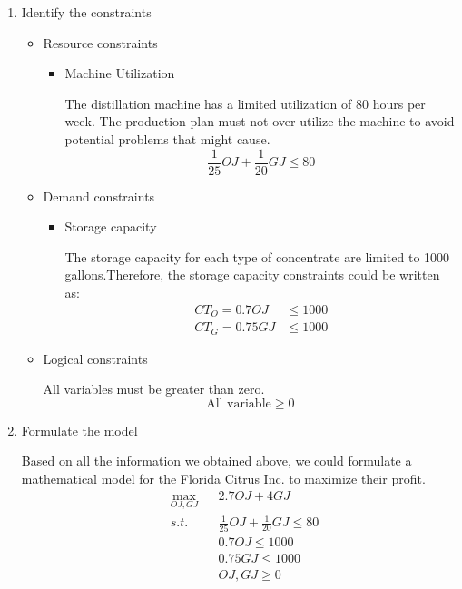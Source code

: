 \documentclass[11pt]{article}
\begin{document}
\begin{enumerate}
\begin{enumerate}
    \item Identify the constraints\par
    \begin{itemize}
        \item Resource constraints\par
        \begin{itemize}
            \item Machine Utilization\par
            The distillation machine has a limited utilization of 80 hours per week. The production plan must not over-utilize the machine to avoid potential problems that might cause. 
            $$
            \frac{1}{25} \mathit{OJ} + \frac{1}{20} \mathit{GJ} \leq 80 
            $$
        \end{itemize}
        \item Demand constraints\par
        \begin{itemize}
            \item Storage capacity\par
            The storage capacity for each type of concentrate are limited to 1000 gallons.Therefore, the storage capacity constraints could be written as:
            \begin{align*}
                  \mathit{CT_O} = 0.7 \mathit{OJ} & \leq 1000  \\
                 \mathit{CT_G} = 0.75 \mathit{GJ} & \leq 1000 
            \end{align*}
        \end{itemize}
        
        \item Logical constraints\par
            All variables must be greater than zero.
            $$
            \text{All variable} \geq 0
            $$    
    \end{itemize}
    \item Formulate the model \par
    Based on all the information we obtained above, we could formulate a mathematical model for the Florida Citrus Inc. to maximize their profit. 
    \begin{align*}
        & \max_{\mathit{OJ}, \mathit{GJ}} & & 2.7\mathit{OJ} + 4\mathit{GJ} \\
        & s.t. & & \frac{1}{25} \mathit{OJ} + \frac{1}{20} \mathit{GJ} \leq 80 \\
        &&&  0.7\mathit{OJ} \leq 1000  \\
        &&& 0.75 \mathit{GJ}  \leq 1000 \\
        &&& \mathit{OJ}, \mathit{GJ} \geq 0
    \end{align*}
\end{enumerate}

\end{enumerate}
\end{document}
